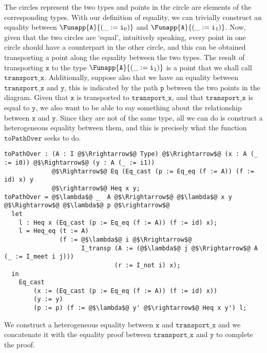 \documentclass[12pt,twoside,maitrise]{dms}
\theoremstyle{definition}
\numberwithin{equation}{section}
\numberwithin{table}{chapter}
\numberwithin{figure}{chapter}
\newcommand\id[1] {\texttt{#1}}
\begin{document}
\begin{center}
\begin{tikzpicture}[x=0.75pt,y=0.75pt,yscale=-1,xscale=1]
\end{tikzpicture}
\end{center}

The circles represent the two types and points in the circle are elements of the corresponding types. With our definition of equality, we can trivially construct an equality between $\Funapp{\id{A}}{(\earg{\_}{\ileft})}$ and $\Funapp{\id{A}}{(\earg{\_}{\iright})}$. Now, given that the two circles are `equal', intuitively speaking, every point in one circle should have a counterpart in the other circle, and this can be obtained transporting a point along the equality between the two types. The result of transporting $\id{x}$ to the type $\Funapp{\id{A}}{(\earg{\_}{\iright})}$ is a point that we shall call $\id{transport\_x}$. Additionally, suppose also that we have an equality between $\id{transport\_x}$ and $\id{y}$, this is indicated by the path $\id{p}$ between the two points in the diagram. Given that $\id{x}$ is transported to $\id{transport\_x}$, and that $\id{transport\_x}$ is equal to $\id{y}$, we also want to be able to say something about the relationship between $\id{x}$ and $\id{y}$. Since they are not of the same type, all we can do is construct a heterogeneous equality between them, and this is precisely what the function $\id{toPathOver}$ seeks to do.

\begin{verbatim}
toPathOver : (A : I @$\Rrightarrow$@ Type) @$\Rrightarrow$@ (x : A (_ := i0)) @$\Rightarrow$@ (y : A (_ := i1))
             @$\Rightarrow$@ Eq (Eq_cast (p := Eq_eq (f := A)) (f := id) x) y
             @$\rightarrow$@ Heq x y;
toPathOver = @$\lambda$@ _  A @$\Rrightarrow$@ @$\lambda$@ x y @$\Rightarrow$@ @$\lambda$@ p @$\rightarrow$@
  let
    l : Heq x (Eq_cast (p := Eq_eq (f := A)) (f := id) x);
    l = Heq_eq (t := A)
               (f := @$\lambda$@ i @$\Rrightarrow$@
                     I_transp (A := (@$\lambda$@ j @$\Rrightarrow$@ A (_ := I_meet i j)))
                              (r := I_not i) x);
  in
    Eq_cast
        (x := (Eq_cast (p := Eq_eq (f := A)) (f := id) x))
        (y := y)
        (p := p) (f := @$\lambda$@ y' @$\rightarrow$@ Heq x y') l;
\end{verbatim}

We construct a heterogeneous equality between $\id{x}$ and $\id{transport\_x}$ and we concatenate it with the equality proof between $\id{transport\_x}$ and $\id{y}$ to complete the proof.
\end{document}
